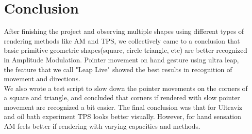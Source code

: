 %

\chapter{Conclusion}
\label{sec:conclusion}
After finishing the project and observing multiple shapes using different types of 
rendering methods like AM and TPS, we collectively came to a conclusion that basic primitive geometric
shapes(square, circle triangle, etc) are better recognized in Amplitude Modulation. 
Pointer movement on hand gesture using ultra leap, the feature that we call "Leap Live" 
showed the best results in recognition of movement and directions. \\[2mm]
We also wrote a test script to slow down the pointer movements on the corners of a square and triangle, 
and concluded that corners if rendered with slow pointer movement are recognized a bit easier. The final 
conclusion was that for Ultraviz and oil bath experiment TPS looks better visually. 
However, for hand sensation AM feels better if rendering with varying capacities and methods.

